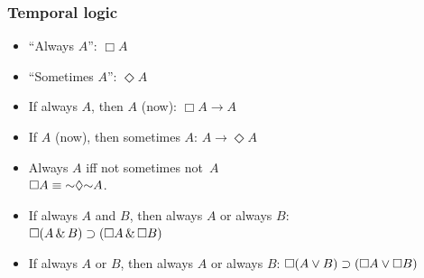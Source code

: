 \begin{frame}
\frametitle{Temporal logic}

\begin{itemize}[<+->]
  \item ``Always $A$'': $\Box A$
  \item ``Sometimes $A$'': $\Diamond A$
  \item If always $A$, then $A$ (now): $\Box A \to A$
  \item If $A$ (now), then sometimes $A$: $A \to \Diamond A$
  \item Always $A$ iff not sometimes not~$A$\\
  $\Box A \eiff \enot\Diamond \enot A$.
  \item If always $A$ and $B$, then always $A$ or always $B$:\\
  $\Box(A \,\&\, B) \supset (\Box A \,\&\, \Box B)$
  \item If always $A$ or $B$, then always $A$ or always $B$:
  $\Box(A \vee B) \supset (\Box A \vee \Box B)$
\end{itemize}
\end{frame}




